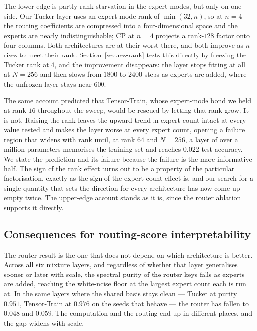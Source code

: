 The lower edge is partly rank starvation in the expert modes, but only on one
side. Our Tucker layer uses an expert-mode rank of $\min(32, n)$, so at $n = 4$
the routing coefficients are compressed into a four-dimensional space and the
experts are nearly indistinguishable; CP at $n = 4$ projects a rank-$128$
factor onto four columns. Both architectures are at their worst there, and both
improve as $n$ rises to meet their rank. Section~\ref{sec:res-rank} tests this
directly by freezing the Tucker rank at $4$, and the improvement disappears:
the layer stops fitting at all at $N = 256$ and then slows from $1800$ to
$2400$ steps as experts are added, where the unfrozen layer stays near $600$.

The same account predicted that Tensor-Train, whose expert-mode bond we held at
rank $16$ throughout the sweep, would be rescued by letting that rank grow. It
is not. Raising the rank leaves the upward trend in expert count intact at
every value tested and makes the layer worse at every expert count, opening a
failure region that widens with rank until, at rank $64$ and $N = 256$, a
layer of over a million parameters memorises the training set and reaches
$0.022$ test accuracy. We state the prediction and its failure because the
failure is the more informative half. The sign of the rank effect turns out to
be a property of the particular factorisation, exactly as the sign of the
expert-count effect is, and our search for a single quantity that sets the
direction for every architecture has now come up empty twice. The upper-edge
account stands as it is, since the router ablation supports it directly.

\subsection{Consequences for routing-score interpretability}

The router result is the one that does not depend on which architecture is
better. Across all six mixture layers, and regardless of whether that layer
generalises sooner or later with scale, the spectral purity of the router keys falls as experts are added, reaching the white-noise floor at the largest expert count each is run at. In
the same layers where the shared basis stays clean --- Tucker at purity
$0.951$, Tensor-Train at $0.976$ on the seeds that behave --- the router has
fallen to $0.048$ and $0.059$. The computation and the routing end up in
different places, and the gap widens with scale.

